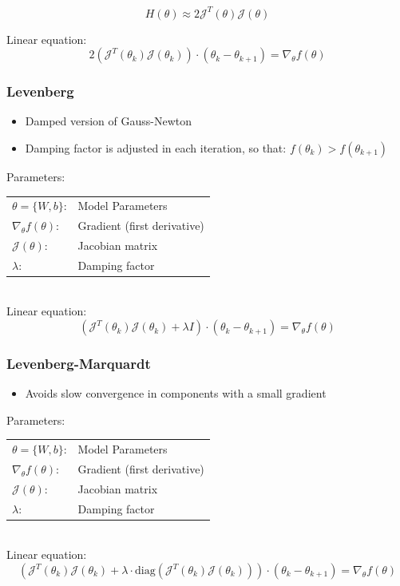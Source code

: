 \documentclass[10pt,a4paper]{article}
\begin{document}
$$
	H(\theta) \approx 2 \mathcal J^T(\theta) \mathcal J(\theta)
$$

Linear equation:
$$
	2(\mathcal J^T(\theta_k) \mathcal J(\theta_k)) ⋅ (\theta_k - \theta_{k + 1}) = \nabla_\theta f(\theta)
$$
	

\subsubsection{Levenberg}
\begin{itemize}
	\item Damped version of Gauss-Newton
	\item Damping factor is adjusted in each iteration, so that: $f(\theta_k) > f(\theta_{k + 1})$
\end{itemize}

Parameters: \\
\begin{tabular}{ll}
	$\theta = \{W, b\}$: & Model Parameters \\
	$\nabla_\theta f(\theta)$: & Gradient (first derivative) \\
	$\mathcal J(\theta)$: & Jacobian matrix \\
	$\lambda$: & Damping factor
\end{tabular} \\

Linear equation:
$$
	(\mathcal J^T(\theta_k) \mathcal J(\theta_k) + \lambda I) ⋅ (\theta_k - \theta_{k + 1}) = \nabla_\theta f(\theta)
$$

\subsubsection{Levenberg-Marquardt}
\begin{itemize}
	\item Avoids slow convergence in components with a small gradient
\end{itemize}

Parameters: \\
\begin{tabular}{ll}
	$\theta = \{W, b\}$: & Model Parameters \\
	$\nabla_\theta f(\theta)$: & Gradient (first derivative) \\
	$\mathcal J(\theta)$: & Jacobian matrix \\
	$\lambda$: & Damping factor
\end{tabular} \\

Linear equation:
$$
	(\mathcal J^T(\theta_k) \mathcal J(\theta_k) + \lambda ⋅ \textrm{diag}(\mathcal J^T(\theta_k) \mathcal J(\theta_k))) ⋅ (\theta_k - \theta_{k + 1}) = \nabla_\theta f(\theta)
$$
\end{document}
